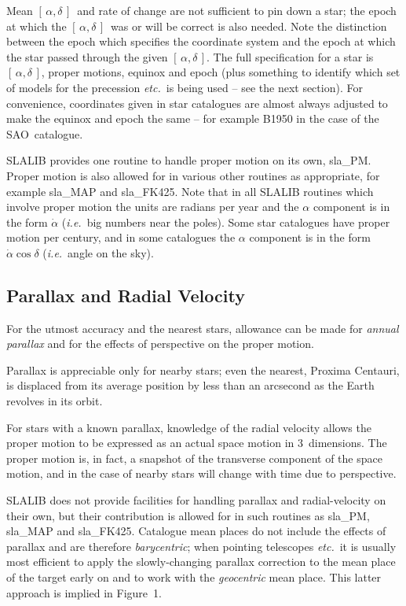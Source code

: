 \documentclass[11pt,twoside]{article}
\newcommand{\radec}     {$[\,\alpha,\delta\,]$}
\begin{document}
Mean \radec\ and rate of change are not sufficient to pin
down a star;  the epoch at which the \radec\ was or will
be correct is also needed.  Note the distinction
between the epoch which specifies the
coordinate system and the epoch at which the star passed
through the given \radec.  The full specification for a star
is \radec, proper motions, equinox and epoch (plus something to
identify which set of models for the precession {\it etc.}\ is
being used -- see the next section).
For convenience, coordinates given in star catalogues are almost
always adjusted to make the equinox and epoch the same -- for
example B1950 in the case of the SAO~catalogue.

SLALIB provides one routine to handle proper motion on its own,
sla\_PM.
Proper motion is also allowed for in various other
routines as appropriate, for example
sla\_MAP
and
sla\_FK425.
Note that in all SLALIB routines which involve proper motion
the units are radians per year and the
$\alpha$ component is in the form $\dot{\alpha}$ ({\it i.e.}\ big
numbers near the poles).
Some star catalogues have proper motion per century, and
in some catalogues the $\alpha$ component is in the form
$\dot{\alpha}\cos\delta$ ({\it i.e.}\ angle on the sky).

\subsection{Parallax and Radial Velocity}
For the utmost accuracy and the nearest stars, allowance can
be made for {\it annual parallax}\/ and for the effects of perspective
on the proper motion.

Parallax is appreciable only for nearby stars;  even
the nearest, Proxima Centauri, is displaced from its average
position by less than
an arcsecond as the Earth revolves in its orbit.

For stars with a known parallax, knowledge of the radial velocity
allows the proper motion to be expressed as an actual space
motion in 3~dimensions.  The proper motion is,
in fact, a snapshot of the transverse component of the
space motion, and in the case of nearby stars will
change with time due to perspective.

SLALIB does not provide facilities for handling parallax
and radial-velocity on their own, but their contribution is
allowed for in such routines as
sla\_PM,
sla\_MAP
and
sla\_FK425.
Catalogue mean
places do not include the effects of parallax and are therefore
{\it barycentric};  when pointing telescopes {\it etc.}\ it is
usually most efficient to apply the slowly-changing
parallax correction to the mean place of the target early on
and to work with the {\it geocentric}\/ mean place.  This latter
approach is implied in Figure~1.
\end{document}
